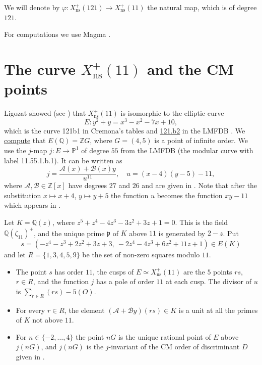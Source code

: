 \documentclass[11pt,reqno]{amsart}
\newcommand{\Q}{\mathbb{Q}}
\newcommand{\Z}{\mathbb{Z}}
\newcommand{\PP}{\mathbb{P}}
\newcommand{\fp}{\mathfrak{p}}
\newcommand{\ns}{\mathrm{ns}}
\newcommand{\Xns}[1]{X_{\ns}^+(#1)}
\newcommand{\lmfdbec}[3]{\href{https://www.lmfdb.org/EllipticCurve/Q/#1/#2/#3}{#1.#2#3}}
\newcommand{\repocommit}{c12c8c3705ed0b6b52254df69bd5ffe84542d568}
\newcommand{\gitlink}[2]{\href{https://github.com/F-Najman/Xns-121-/blob/\repocommit/#1}{#2}}
\newcommand{\githubbare}[1]{\href{https://github.com/F-Najman/Xns-121-/blob/\repocommit/#1}{\path{#1}}}
\theoremstyle{definition}
\numberwithin{equation}{section}
\begin{document}
We will denote by $\varphi\colon \Xns{121}\rightarrow \Xns{11}$ the natural map, which is of degree $121$.

For computations we use Magma \cite{magma}.

\section{The curve \texorpdfstring{$\Xns{11}$}{Xns+(11)} and the CM points}\label{sec:xns11}

Ligozat \cite{Ligozat77} showed (see \cite[Section 4]{ST12}) that $\Xns{11}$ is isomorphic to the elliptic curve
$$E\colon y^2+y=x^3-x^2-7x+10,$$
which is the curve 121b1 in Cremona's tables and \lmfdbec{121}{b}{2} in the LMFDB \cite{lmfdb}. We \gitlink{code/model.m}{compute} that $E(\Q)=\Z G$, where $G=(4,5)$ is a point of infinite order. We use the $j$-map $j\colon E\rightarrow \PP^1$ of degree $55$ from the LMFDB (the modular curve with label 11.55.1.b.1). It can be written as
$$j=\frac{\mathcal A(x)+\mathcal B(x)y}{u^{11}}, \quad u=(x-4)(y-5)-11,$$
where $\mathcal A,\mathcal B\in \Z[x]$ have degrees $27$ and $26$ and are given in \githubbare{code/compact_jmap.m}. Note that after the substitution $x\mapsto x+4$, $y\mapsto y+5$ the function $u$ becomes the function $xy-11$ which appears in \cite[Theorem 4.1]{ST12}.

Let $K=\Q(z)$, where $z^5+z^4-4z^3-3z^2+3z+1=0$. This is the field $\Q(\zeta_{11})^+$, and the unique prime $\fp$ of $K$ above $11$ is generated by $2-z$. Put
$$s=\left(-z^4-z^3+2z^2+3z+3,\ -2z^4-4z^3+6z^2+11z+1\right)\in E(K)$$
and let $R=\{1,3,4,5,9\}$ be the set of non-zero squares modulo $11$.

\begin{proposition}\label{prop:cusps}
\begin{itemize}
\item[a)] The point $s$ has order $11$, the cusps of $E\simeq \Xns{11}$ are the $5$ points $rs$, $r\in R$, and the function $j$ has a pole of order $11$ at each cusp. The divisor of $u$ is $\sum_{r\in R}(rs)-5(O)$.
\item[b)] For every $r\in R$, the element $(\mathcal A+\mathcal By)(rs)\in K$ is a unit at all the primes of $K$ not above $11$.
\item[c)] For $n\in\{-2,\ldots,4\}$ the point $nG$ is the unique rational point of $E$ above $j(nG)$, and $j(nG)$ is the $j$-invariant of the CM order of discriminant $D$ given in .
\end{itemize}
\end{proposition}
\end{document}
